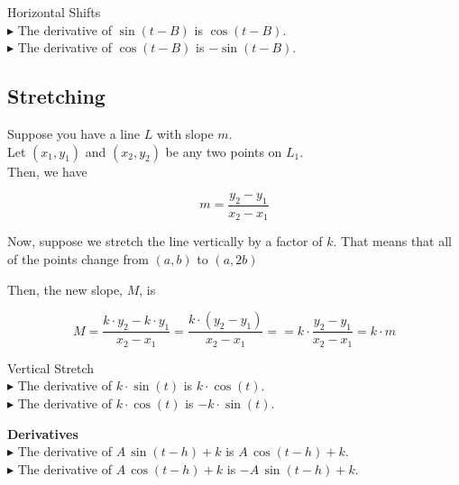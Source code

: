 \documentclass{ximera}
\begin{document}
\begin{observation} Horizontal Shifts \\

$\blacktriangleright$ The derivative of $\sin(t - B)$ is $\cos(t - B)$. \\

$\blacktriangleright$ The derivative of $\cos(t - B)$ is $-\sin(t - B)$. \\

\end{observation}















\subsection{Stretching}


Suppose you have a line $L$ with slope $m$. \\

Let $(x_1, y_1)$ and $(x_2, y_2)$ be any two points on $L_1$. \\

Then, we have


\[
m = \frac{y_2 - y_1}{x_2 - x_1}
\]






Now, suppose we stretch the line vertically by a factor of $k$.  That means that all of the points change from $(a, b)$ to $(a, 2b)$

Then, the new slope, $M$, is 



\[
M = \frac{k \cdot y_2 - k \cdot y_1}{x_2 - x_1} = \frac{k \cdot (y_2 - y_1)}{x_2 - x_1} = =k \cdot \frac{y_2 - y_1}{x_2 - x_1} = k \cdot m
\]





\begin{observation} Vertical Stretch \\

$\blacktriangleright$ The derivative of $k \cdot \sin(t)$ is $k \cdot \cos(t)$. \\

$\blacktriangleright$ The derivative of $k \cdot \cos(t)$ is $-k \cdot \sin(t)$. \\

\end{observation}











\begin{theorem} \textbf{\textcolor{green!50!black}{Derivatives}}  \\

$\blacktriangleright$ The derivative of $A \, \sin(t - h) + k$ is $A \, \cos(t - h) + k$. \\

$\blacktriangleright$ The derivative of $A \, \cos(t - h) + k$ is $-A \, \sin(t - h) + k$. \\

\end{theorem}
\end{document}
